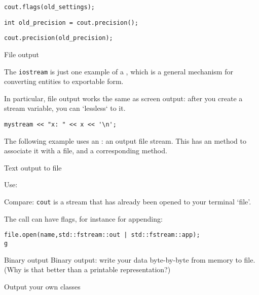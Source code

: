 \begin{verbatim}
cout.flags(old_settings);
\end{verbatim}

\begin{verbatim}
int old_precision = cout.precision();
\end{verbatim}

\begin{verbatim}
cout.precision(old_precision);
\end{verbatim}

 {File output}

The \lstinline{iostream} is just one example of a ,
which is a general mechanism for converting entities to exportable form.

In particular, file output works the same as screen output:
after you create a stream variable, you can `lessless` to it.
\begin{lstlisting}
mystream << "x: " << x << '\n';
\end{lstlisting}

The following example uses an :
an output file stream.
This has an  method
to associate it with a file, and a corresponding  method.

\begin{block}{Text output to file}
  \label{sl:io-file}

  Use:
  \def\snippetcodefraction{.5}
  \def\snippetanswfraction{.5}

  Compare: \lstinline{cout} is a stream that has already been opened
  to your terminal `file'.
\end{block}

The  call can have flags, for instance for appending:
\begin{lstlisting}
file.open(name,std::fstream::out | std::fstream::app);
g\end{lstlisting}

\begin{block}{Binary output}
  \label{sl:io-bin}
  Binary output: write your data byte-by-byte from memory to file.\\
  (Why is that better than a printable representation?)
  
\end{block}

 {Output your own classes}
\label{sec:lessless}

